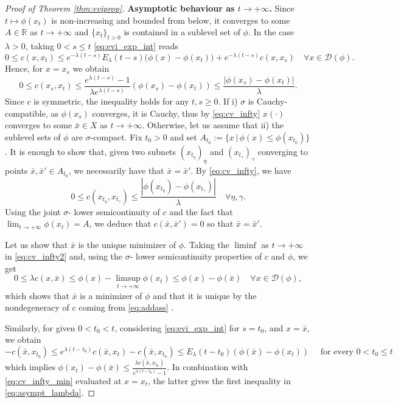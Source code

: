 \documentclass[reqno]{amsart}
\theoremstyle{plain}
\theoremstyle{remark}
\theoremstyle{plain}
\numberwithin{equation}{section}
\theoremstyle{remark}
\newcommand{\R}{\mathbb{R}}
\newcommand{\x}{\bar x}
\newcommand{\tb}{\textbf}
\newcommand{\dom}[1]{\mathscr{D}(#1)}
\begin{document}
\begin{proof}[Proof of Theorem \ref{thm:eviprop}]
    \tb{\bf Asymptotic behaviour as $t\to +\infty$.} Since $t\mapsto \phi(x_t)$  is non-increasing and bounded from below, it converges to some $A\in\R$  as $t \to + \infty$ and   $\{x_t\}_{t >0}$  is contained in a sublevel set of $\phi$.  In the case  $\lambda>0$,  taking  $0<s\le t$ \eqref{eq:evi_exp_int} reads 
    \begin{equation}\label{eq:cv_infty2}
        0 \le c(x,x_t)\le e^{-\lambda (t-s)}E_\lambda(t-s)\big(\phi(x)-\phi(x_t)
        \big)+e^{-\lambda (t-s)}c(x,x_s)  \quad \forall  x \in \dom{\phi}.
    \end{equation}
    Hence, for $x=x_s$ we obtain 
    \begin{equation}\label{eq:cv_infty}
        0 \le c(x_s,x_t)\le \frac{e^{\lambda(t-s)}-1}{\lambda e^{\lambda(t-s)}}(\phi(x_s)-\phi(x_t))\le \frac{|\phi(x_s)-\phi(x_t)|}{\lambda} . 
    \end{equation}
      Since $c$ is symmetric, the inequality holds for any  $t,s \ge 0$.  If i) $\sigma$ is Cauchy-compatible, as $\phi(x_s)$ converges, it is Cauchy, thus by \eqref{eq:cv_infty} $x(\cdot)$ converges to some $\x \in X$  as  $t\to +\infty$. 
    Otherwise,  let us assume that  ii) the sublevel sets of $\phi$ are  $\sigma$-compact. Fix $t_0>0$ and set $A_{t_0}:=\{x\, | \, \phi(x)\le \phi(x_{t_0})\}$. It is enough to show that, given two subnets $(x_{t_\eta})_\eta$ and $(x_{t_\gamma})_\gamma$ converging to points $\x,\x' \in A_{t_0}$,  we necessarily have that  $\x=\x'$. By \eqref{eq:cv_infty}, we have
    \[ 0 \le c(x_{t_\eta}, x_{t_\gamma}) \le \frac{|\phi(x_{t_\eta})- \phi( x_{t_\gamma})|}{\lambda} \quad  \forall  \eta, \gamma.\]
    Using the  joint $\sigma$- lower semicontinuity of $c$ and the fact that $\lim_{t \to + \infty}\phi(x_t)=A$, we deduce that $c(\x,\x')=0$ so that $\x=\x'$.
    
    
    
    Let us show that $\x$ is the unique minimizer of $\phi$.  Taking the   $\liminf$ as $t \to + \infty$ in \eqref{eq:cv_infty2} and, using the  $\sigma$- lower semicontinuity properties of $c$ and $\phi$, we get 
    \begin{equation}\label{eq:cv_infty_min}
        0 \le \lambda c(x,\x)\le \phi(x)-\limsup_{t\to+\infty}\phi(x_t)\le \phi(x)-\phi(\x)  \quad  \forall  x \in \dom{\phi},
    \end{equation}
     which shows that $\x$ is a minimizer of $\phi$ and that it is unique by  the nondegeneracy  of $c$  coming from \eqref{eq:addass} .

    Similarly,  for given $0<t_0<t$,  considering \eqref{eq:evi_exp_int} for  $s=t_0$, and $x=\x$, we obtain
    \begin{equation*}
        -c(\x,x_{t_0})\le e^{\lambda(t-t_0)}c(\x,x_t)-c(\x,x_{t_0})
    \le E_\lambda(t-t_0)\left(\phi(\x)-\phi(x_t)\right) \quad  \text{ for every } 0 < t_0 \le t 
    \end{equation*}
    which  implies $\phi(x_t)-\phi(\x) \le \frac{\lambda c(\x,x_{t_0})}{e^{\lambda (t-t_0)}-1}$.  In combination   with \eqref{eq:cv_infty_min} evaluated at $x=x_t$,  the latter  gives the first  inequality in  \eqref{eq:asympt_lambda}.


\end{proof}
\end{document}
